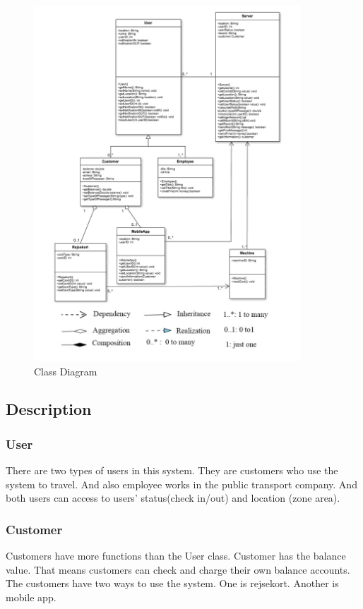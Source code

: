 \begin{figure}[ht!]
\centering
\includegraphics[width=100mm]{graphics/classdiagram.jpg}
\caption{Class Diagram}
\label{overflow}
\end{figure}

\subsection*{Description}

\subsubsection{User}
There are two types of users in this system. They are customers who use the system to travel. And also employee works in the public transport company. And both users can access to users’ status(check in/out) and location (zone area).

\subsubsection{Customer}
Customers have more functions than the User class. Customer has the balance value. That means customers can check and charge their own balance accounts. The customers have two ways to use the system. One is rejsekort. Another is mobile app.

